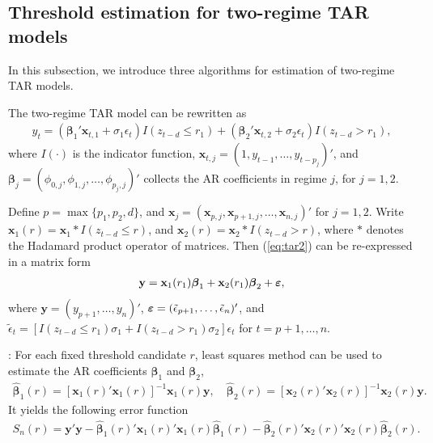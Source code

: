 \subsection{Threshold estimation for two-regime TAR models}
In this subsection, we introduce three algorithms for estimation of two-regime TAR models.

The two-regime TAR model can be rewritten as
\begin{align}\label{eq:tar2}
y_t=({\boldsymbol{\beta}}_1' {\mathbf x}_{t,1}+\sigma_1\epsilon_t) I(z_{t-d} \leq r_1) +({\boldsymbol{\beta}}_2' {\mathbf x}_{t,2}+\sigma_2 \epsilon_t)I(z_{t-d} > r_1),
\end{align}
where  $I(\cdot)$ is the indicator function, ${\mathbf x}_{t,j}=(1,y_{t-1},\ldots,y_{t-p_j})'$, and $\boldsymbol{\beta}_j=(\phi_{0,j},\phi_{1,j}, \ldots,\phi_{p_j,j})'$ collects the AR coefficients in regime $j$, for $j=1,2$. 

Define $p=\max\{p_1,p_2, d\}$, and ${\mathbf x}_j=({\mathbf x}_{p,j},{\mathbf x}_{p+1,j},\ldots, {\mathbf x}_{n,j})'$ for $j=1,2$. Write ${\mathbf x}_1(r)={\mathbf x}_1 * I(z_{t-d}\leq r)$, and ${\mathbf x}_2(r)={\mathbf x}_2 * I(z_{t-d}>r)$, where $*$ denotes the Hadamard product operator of matrices. Then (\ref{eq:tar2}) can be re-expressed in a matrix form
\begin{align}\label{eq:tar_mat}
{\mathbf y}={\mathbf x}_1(r_1) \boldsymbol{\beta}_1+{\mathbf x}_2(r_1)\boldsymbol{\beta}_2+\mbox{\boldmath$\varepsilon$},
\end{align}
where ${\mathbf y}=(y_{p+1},\ldots,y_n)'$, $\mbox{\boldmath$\varepsilon$}=(\tilde{\epsilon}_{p+1},\ldots,\tilde{\epsilon}_n)'$, and $\tilde{\epsilon}_t=[I(z_{t-d}\leq r_1) \sigma_1+I(z_{t-d}>r_1) \sigma_2]\epsilon_t$ for $t=p+1,\ldots, n$.

: For each fixed threshold candidate $r$, least squares method can be used to estimate the AR coefficients $\boldsymbol{\beta}_1$ and $\boldsymbol{\beta}_2$,
\begin{align}\label{eq:beta}
\hat{\boldsymbol{\beta}}_1(r)= [{\mathbf x}_1(r)' {\mathbf x}_1(r)]^{-1}{\mathbf x}_1(r) {\mathbf y}, \quad \hat{\boldsymbol{\beta}}_2(r)= [{\mathbf x}_2(r)' {\mathbf x}_2(r)]^{-1}{\mathbf x}_2(r) {\mathbf y}.
\end{align}
It yields the following error function
\begin{align}\label{eq:Sn}
S_n(r)={\mathbf y}' {\mathbf y}- \hat{\boldsymbol{\beta}}_1(r)'{\mathbf x}_1(r)' {\mathbf x}_1(r) \hat{\boldsymbol{\beta}}_1(r) - \hat{\boldsymbol{\beta}}_2(r)'{\mathbf x}_2(r)' {\mathbf x}_2(r) \hat{\boldsymbol{\beta}}_2(r).
\end{align}

